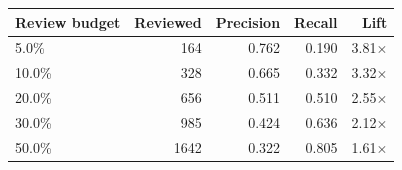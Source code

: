 \begin{tabular}{lrrrr}
\toprule
Review budget & Reviewed & Precision & Recall & Lift \\
\midrule
5.0\% & 164 & 0.762 & 0.190 & 3.81$\times$ \\
10.0\% & 328 & 0.665 & 0.332 & 3.32$\times$ \\
20.0\% & 656 & 0.511 & 0.510 & 2.55$\times$ \\
30.0\% & 985 & 0.424 & 0.636 & 2.12$\times$ \\
50.0\% & 1642 & 0.322 & 0.805 & 1.61$\times$ \\
\bottomrule
\end{tabular}
